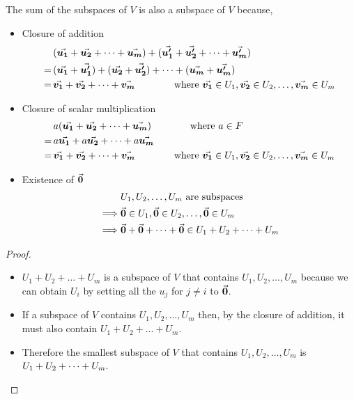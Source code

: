 \documentclass[MathsNotesBase.tex]{subfiles}
\begin{document}
{		The sum of the subspaces of $V$ is also a subspace of $V$ because,
		\begin{itemize}
		\item{Closure of addition
			\begin{align*} 
			&(\vec{\bm{u_1}} + \vec{\bm{u_2}} + \dots + \vec{\bm{u_m}}) + (\vec{\bm{u_1'}} + \vec{\bm{u_2'}} + \dots + \vec{\bm{u_m'}}) \\
			=\, &(\vec{\bm{u_1}} + \vec{\bm{u_1'}}) + (\vec{\bm{u_2}} + \vec{\bm{u_2'}}) + \dots + (\vec{\bm{u_m}} + \vec{\bm{u_m'}}) \\
			=\, &\vec{\bm{v_1}} + \vec{\bm{v_2}} + \dots + \vec{\bm{v_m}} \hspace*{40pt} \text{where } \vec{\bm{v_1}} \in U_1, \vec{\bm{v_2}} \in U_2, \dots , \vec{\bm{v_m}} \in U_m
			\end{align*}
		}
		\item{Closure of scalar multiplication
				\begin{align*} 
				&a(\vec{\bm{u_1}} + \vec{\bm{u_2}} + \dots + \vec{\bm{u_m}}) \hspace*{40pt} \text{where } a \in F\\
				=\, &a\vec{\bm{u_1}} + a\vec{\bm{u_2}} + \dots + a\vec{\bm{u_m}} \\
				=\, &\vec{\bm{v_1}} + \vec{\bm{v_2}} + \dots + \vec{\bm{v_m}} \hspace*{40pt} \text{where } \vec{\bm{v_1}} \in U_1, \vec{\bm{v_2}} \in U_2, \dots , \vec{\bm{v_m}} \in U_m
				\end{align*}
		}
		\item{Existence of $\vec{\bm{0}}$
			\begin{align*}
			&U_1,U_2,\dots,U_m \text{ are subspaces } \\
			\implies &\vec{\bm{0}} \in U_1, \vec{\bm{0}} \in U_2,\dots,\vec{\bm{0}} \in U_m \\
			\implies &\vec{\bm{0}} + \vec{\bm{0}} + \dots + \vec{\bm{0}} \in U_1 + U_2 + \dots + U_m
			\end{align*}
		}
		\end{itemize}

		\bigskip
		\begin{proof}
			\begin{itemize}[label={}]
			\item{$U_1 + U_2 + \dots + U_m$ is a subspace of $V$ that contains $U_1,U_2,\dots,U_m$ because we can obtain $U_i$ by setting all the $u_j$ for $j \neq i$ to $\vec{\bm{0}}$.}
			\item{If a subspace of $V$ contains $U_1,U_2,\dots,U_m$ then, by the closure of addition, it must also contain $U_1 + U_2 + \dots + U_m$.}
			\item{Therefore the smallest subspace of $V$ that contains $U_1,U_2,\dots,U_m$ is $U_1 + U_2 + \dots + U_m. \qedhere$}
			\end{itemize}
		\end{proof}
		
}
\end{document}
